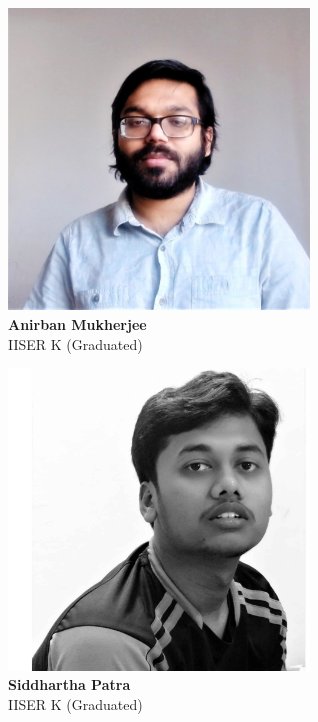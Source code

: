 \documentclass[aspectratio=169]{beamer}
\begin{document}
\begin{frame}{}
\begin{minipage}{0.25\textwidth}
	\centering
	\includegraphics[width=0.6\textwidth]{amukherjee.jpg}\\
	\footnotesize{{\bf Anirban Mukherjee}\\
	IISER K (Graduated)}
\end{minipage}
\begin{minipage}{0.25\textwidth}
	\centering
	\includegraphics[width=0.6\textwidth]{spatra.jpg}\\
	\footnotesize{{\bf Siddhartha Patra}\\
	IISER K (Graduated)}
\end{minipage}
\begin{minipage}{0.1\textwidth}

\end{minipage}
\end{frame}
\end{document}
